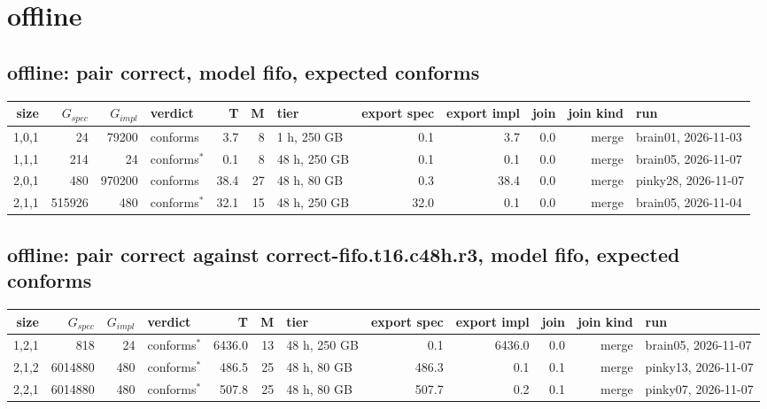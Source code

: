 \documentclass[10pt]{article}
\begin{document}
\section*{offline}
\subsection*{offline: pair \textsf{correct}, model fifo, expected conforms}
\begin{longtable}{@{}rrrlrrlrrrrl@{}}
\toprule
size & $G_{\mathit{spec}}$ & $G_{\mathit{impl}}$ & verdict & T & M & tier & export spec & export impl & join & join kind & run \\
\midrule
\endhead
\color{blue} 1,0,1 & 24 & 79200 & conforms & 3.7 & 8 & 1 h, 250 GB & 0.1 & 3.7 & 0.0 & merge & brain01, 2026-11-03 \\
\color{blue} 1,1,1 & 214 & 24 & conforms$^{\ast}$ & 0.1 & 8 & 48 h, 250 GB & 0.1 & 0.1 & 0.0 & merge & brain05, 2026-11-07 \\
\color{blue} 2,0,1 & 480 & 970200 & conforms & 38.4 & 27 & 48 h, 80 GB & 0.3 & 38.4 & 0.0 & merge & pinky28, 2026-11-07 \\
\color{blue} 2,1,1 & 515926 & 480 & conforms$^{\ast}$ & 32.1 & 15 & 48 h, 250 GB & 32.0 & 0.1 & 0.0 & merge & brain05, 2026-11-04 \\
\bottomrule
\end{longtable}
\subsection*{offline: pair \textsf{correct} against \textsf{correct-fifo.t16.c48h.r3}, model fifo, expected conforms}
\begin{longtable}{@{}rrrlrrlrrrrl@{}}
\toprule
size & $G_{\mathit{spec}}$ & $G_{\mathit{impl}}$ & verdict & T & M & tier & export spec & export impl & join & join kind & run \\
\midrule
\endhead
\color{blue} 1,2,1 & 818 & 24 & conforms$^{\ast}$ & 6436.0 & 13 & 48 h, 250 GB & 0.1 & 6436.0 & 0.0 & merge & brain05, 2026-11-07 \\
\color{blue} 2,1,2 & 6014880 & 480 & conforms$^{\ast}$ & 486.5 & 25 & 48 h, 80 GB & 486.3 & 0.1 & 0.1 & merge & pinky13, 2026-11-07 \\
\color{blue} 2,2,1 & 6014880 & 480 & conforms$^{\ast}$ & 507.8 & 25 & 48 h, 80 GB & 507.7 & 0.2 & 0.1 & merge & pinky07, 2026-11-07 \\
\bottomrule
\end{longtable}
\end{document}
